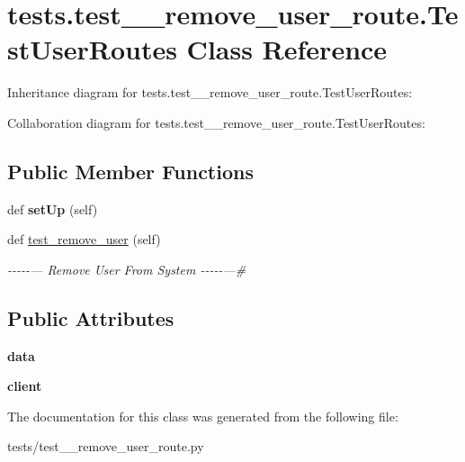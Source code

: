 \hypertarget{classtests_1_1test__11__remove__user__route_1_1_test_user_routes}{}\section{tests.\+test\+\_\+\_\+remove\+\_\+user\+\_\+route.\+Test\+User\+Routes Class Reference}
\label{classtests_1_1test__11__remove__user__route_1_1_test_user_routes}


Inheritance diagram for tests.\+test\+\_\+\_\+remove\+\_\+user\+\_\+route.\+Test\+User\+Routes\+:


Collaboration diagram for tests.\+test\+\_\+\_\+remove\+\_\+user\+\_\+route.\+Test\+User\+Routes\+:
\subsection*{Public Member Functions}
\begin{DoxyCompactItemize}
\item 
\mbox{\label{classtests_1_1test__11__remove__user__route_1_1_test_user_routes_a7f6fc390ad0ed6aaada5583ad450e24f}} 
def {\bfseries set\+Up} (self)
\item 
\mbox{\label{classtests_1_1test__11__remove__user__route_1_1_test_user_routes_a4fab17fe9092281d33bbd317fbfed212}} 
def \hyperlink{classtests_1_1test__11__remove__user__route_1_1_test_user_routes_a4fab17fe9092281d33bbd317fbfed212}{test\+\_\+remove\+\_\+user} (self)
\begin{DoxyCompactList}\small\item\em -\/-\/-\/-\/-\/--- Remove User From System -\/-\/-\/-\/-\/---\# \end{DoxyCompactList}\end{DoxyCompactItemize}
\subsection*{Public Attributes}
\begin{DoxyCompactItemize}
\item 
\mbox{\label{classtests_1_1test__11__remove__user__route_1_1_test_user_routes_af1719a725bf8d7f997da8e8a1fe75aa3}} 
{\bfseries data}
\item 
\mbox{\label{classtests_1_1test__11__remove__user__route_1_1_test_user_routes_a988138cd2400f5634364416f4bacbc49}} 
{\bfseries client}
\end{DoxyCompactItemize}


The documentation for this class was generated from the following file\+:\begin{DoxyCompactItemize}
\item 
tests/test\+\_\+\_\+remove\+\_\+user\+\_\+route.\+py\end{DoxyCompactItemize}
